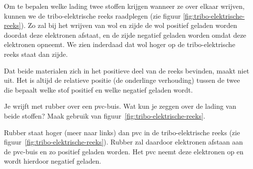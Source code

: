 \documentclass{ximera}
\begin{document}
\begin{example}[expandable=true,title={Welke lading krijgen wol en zijde?}]\nl
Om te bepalen welke lading twee stoffen krijgen wanneer ze over elkaar wrijven, kunnen we de tribo-elektrische reeks raadplegen (zie figuur \ref{fig:tribo-elektrische-reeks}). Zo zal bij het wrijven van wol en zijde de wol positief geladen worden doordat deze elektronen afstaat, en de zijde negatief geladen worden omdat deze elektronen opneemt. We zien inderdaad dat wol hoger op de tribo-elektrische reeks staat dan zijde.
\begin{hint}
Dat beide materialen zich in het positieve deel van de reeks bevinden, maakt niet uit. Het is altijd de relatieve positie (de onderlinge verhouding) tussen de twee die bepaalt welke stof positief en welke negatief geladen wordt.
\end{hint}
\end{example}
\begin{question}
    Je wrijft met rubber over een pvc-buis. Wat kun je zeggen over de lading van beide stoffen? Maak gebruik van figuur~\ref{fig:tribo-elektrische-reeks}.
    
    \begin{multipleChoice}
    \end{multipleChoice}
    \begin{solution}
        Rubber staat hoger (meer naar links) dan pvc in de tribo-elektrische reeks (zie figuur~\ref{fig:tribo-elektrische-reeks}). Rubber zal daardoor elektronen afstaan aan de pvc-buis en zo positief geladen worden. Het pvc neemt deze elektronen op en wordt hierdoor negatief geladen. 
    \end{solution}
\end{question}
\end{document}
